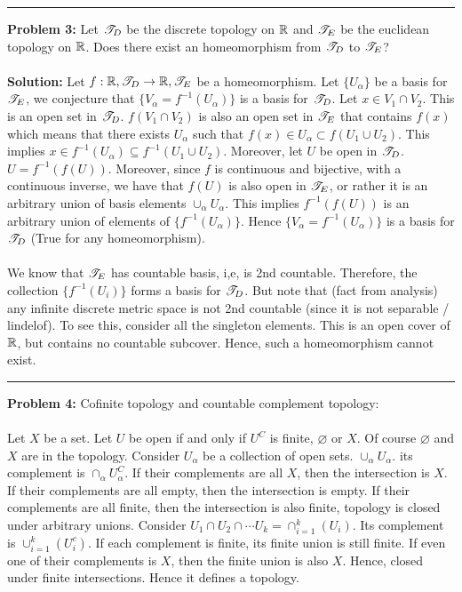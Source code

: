 \documentclass[main.tex]{subfiles}
\begin{document}
\par\noindent\rule{\textwidth}{0.4pt}
\textbf{Problem 3:} Let $\mathscr T_D$ be the discrete topology on $\mathbb R$ and $\mathscr T_E$ be the euclidean topology on $\mathbb R$. Does there exist an homeomorphism from $\mathscr T_D$ to $\mathscr T_E$?
\\\\ \textbf{Solution:} Let $f:\mathbb R,\mathscr T_D \to \mathbb R, \mathscr T_E$ be a homeomorphism. Let $\{U_{\alpha}\}$ be a basis for $\mathscr T_E$, we conjecture that $\{V_{\alpha}=f^{-1}(U_{\alpha})\}$ is a basis for $\mathscr T_D$. Let $x \in V_1 \cap V_2$. This is an open set in $\mathscr T_D$. $f(V_1 \cap V_2)$ is also an open set in $\mathscr T_E$ that contains $f(x)$ which means that there exists $U_{\alpha}$ such that $f(x) \in U_{\alpha} \subset f(U_1 \cup U_2)$. This implies $x \in f^{-1}(U_{\alpha}) \subseteq f^{-1}(U_1 \cup U_2)$. Moreover, let $U$ be open in $\mathscr T_D$. $U=f^{-1}(f(U))$. Moreover, since $f$ is continuous and bijective, with a continuous inverse, we have that $f(U)$ is also open in $\mathscr T_E$, or rather it is an arbitrary union of basis elements $\cup_{\alpha}U_{\alpha}$. This implies $f^{-1}(f(U))$ is an arbitrary union of elements of $\{f^{-1}(U_{\alpha})\}$. Hence $\{V_{\alpha}=f^{-1}(U_{\alpha})\}$ is a basis for $\mathscr T_D$ (True for any homeomorphism).
\\\\ We know that $\mathscr T_E$ has countable basis, i,e, is 2nd countable. Therefore, the collection $\{f^{-1}(U_i)\}$ forms a basis for $\mathscr T_D$. But note that (fact from analysis) any infinite discrete metric space is not 2nd countable (since it is not separable / lindelof). To see this, consider all the singleton elements. This is an open cover of $\mathbb R$, but contains no countable subcover. Hence, such a homeomorphism cannot exist.
\par\noindent\rule{\textwidth}{0.4pt}
\textbf{Problem 4:} Cofinite topology and countable complement topology:
\\\\ Let $X$ be a set. Let $U$ be open if and only if $U^C$ is finite, $\varnothing$ or $X$. Of course $\varnothing$ and $X$ are in the topology. Consider $U_{\alpha}$ be a collection of open sets. $\cup_{\alpha} U_{\alpha}$. its complement is $\cap_{\alpha} U_{\alpha}^C$. If their complements are all $X$, then the intersection is $X$. If their complements are all empty, then the intersection is empty. If their complements are all finite, then the intersection is also finite, topology is closed under arbitrary unions. Consider $U_1 \cap U_2 \cap \cdots U_k=\cap_{i=1}^k (U_i)$. Its complement is $\cup_{i=1}^{k}(U_i^c)$. If each complement is finite, its finite union is still finite. If even one of their complements is $X$, then the finite union is also $X$. Hence, closed under finite intersections. Hence it defines a topology.
\end{document}
